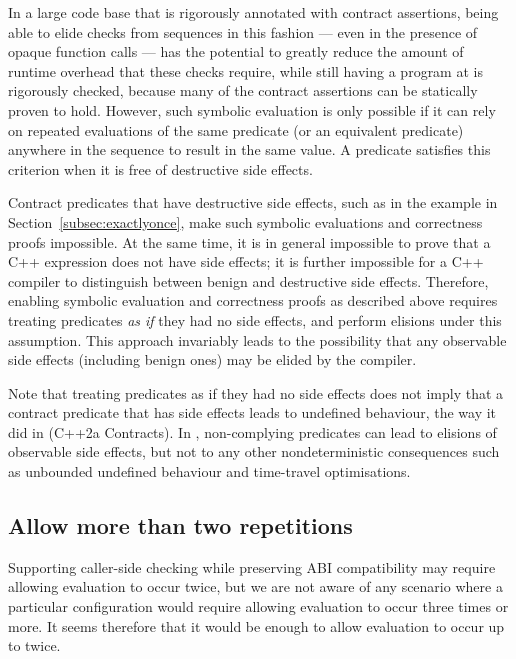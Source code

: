 In a large code base that is rigorously annotated with contract assertions, being able to elide checks from sequences in this fashion --- even in the presence of opaque function calls --- has the potential to greatly reduce the amount of runtime overhead that these checks require, while still having a program at is rigorously checked, because many of the contract assertions can be statically proven to hold. However, such symbolic evaluation is only possible if it can rely on repeated evaluations of the same predicate (or an equivalent predicate) anywhere in the sequence to result in the same value. A predicate satisfies this criterion when it is free of destructive side effects.

Contract predicates that have destructive side effects, such as in the  example in Section~\ref{subsec:exactlyonce}, make such symbolic evaluations and correctness proofs impossible. At the same time, it is in general impossible to prove that a C++ expression does not have side effects; it is further impossible for a C++ compiler to distinguish between benign and destructive side effects. Therefore, enabling symbolic evaluation and correctness proofs as described above requires treating predicates \emph{as if} they had no side effects, and perform elisions under this assumption. This approach invariably leads to the possibility that any observable side effects (including benign ones) may be elided by the compiler.

Note that treating predicates as if they had no side effects does not imply that a contract predicate that has side effects leads to undefined behaviour, the way it did in \cite{P0542R5} (C++2a Contracts). In \cite{P2900R6}, non-complying predicates can lead to elisions of observable side effects, but not to any other nondeterministic consequences such as unbounded undefined behaviour and time-travel optimisations.

\subsection{Allow more than two repetitions}
\label{subsec:rep}

Supporting caller-side checking while preserving ABI compatibility may require allowing evaluation to occur twice, but we are not aware of any scenario where a particular configuration would require allowing evaluation to occur three times or more. It seems therefore that it would be enough to allow evaluation to occur up to twice.

